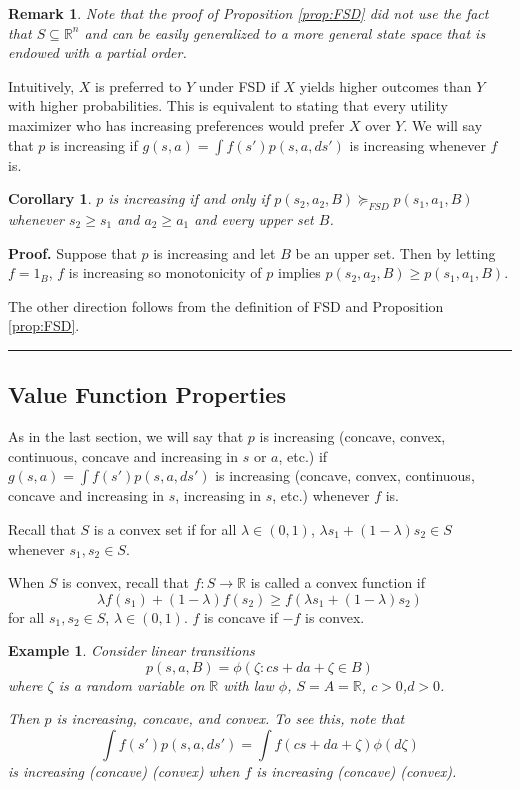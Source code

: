\documentclass[letter,11pt]{article}
\newtheorem{corollary}{Corollary}[section]
\newtheorem{example}{Example}[section]
\newtheorem{remark}{Remark}[section]
\newenvironment {proof}[1][Proof]{\noindent \textbf {#1.} }{\ \rule {0.5em}{0.5em}}
\begin{document}
\begin{remark}
    Note that the proof of Proposition \ref{prop:FSD} did not use the fact that $S \subseteq \mathbb{R}^{n}$ and can be easily generalized to a more general state space that is endowed with a partial order. 
\end{remark}

Intuitively, \(X\) is preferred to \(Y\) under FSD if \(X\) yields higher outcomes than \(Y\) with higher probabilities. This is equivalent to stating that every utility maximizer who has increasing preferences would prefer \(X\) over \(Y\).
We will say that $p$ is increasing if $g(s,a) = \int f(s') p(s,a,ds')$ is increasing  whenever $f$ is.


\begin{corollary} $p$ is increasing if and only if $p(s_{2},a_{2} , B ) \succeq _{FSD}  p(s_{1},a_{1} , B ) $ whenever $s_{2} \geq s_{1}$ and  $a_{2} \geq a_{1}$ and every upper set $B$. 
\end{corollary}

\begin{proof}
    Suppose that $p$ is increasing and let $B$ be an upper set. Then by letting $f= 1_{B}$, $f$ is increasing so monotonicity of $p$ implies $p(s_{2},a_{2} , B ) \geq  p(s_{1},a_{1} , B)$. 

The other direction follows from the definition of FSD and Proposition \ref{prop:FSD}. 
\end{proof}

\subsection{Value Function Properties}
As in the last section, 
we will say that $p$ is increasing (concave, convex, continuous, concave and increasing in $s$ or $a$, etc.) if $g(s,a) = \int f(s') p(s,a,ds')$ is increasing (concave, convex, continuous, concave and increasing in $s$, increasing in $s$, etc.) whenever $f$ is.

 Recall that $S$ is a convex set if for all $\lambda \in (0,1)$, $\lambda s_{1} + (1-\lambda ) s_{2} \in S$ whenever $s_{1},s_{2} \in S$. 

 When $S$ is convex, recall that $f:S \rightarrow \mathbb{R}$ is called a convex function if $$\lambda f(s_{1}) + (1-\lambda) f(s_{2}) \geq f(\lambda s_{1} + (1-\lambda)s_{2})$$ for all $s_{1},s_{2} \in S$, $\lambda \in (0,1)$. $f$ is concave if $-f$ is convex. 

\begin{example}
    Consider linear transitions 
$$p(s,a,B) = \phi (\zeta : cs + da + \zeta \in B)$$
where $\zeta$ is a random variable on $\mathbb{R}$ with law $\phi$, $S=A = \mathbb{R}$, $c>0$,$d>0$. 

Then $p$ is increasing, concave, and convex. To see this, note that 
$$ \int f(s') p(s,a,ds') = \int f(cs+da+\zeta)  \phi(d\zeta) $$
is increasing (concave) (convex) when $f$ is increasing (concave) (convex). 
\end{example}
\end{document}
